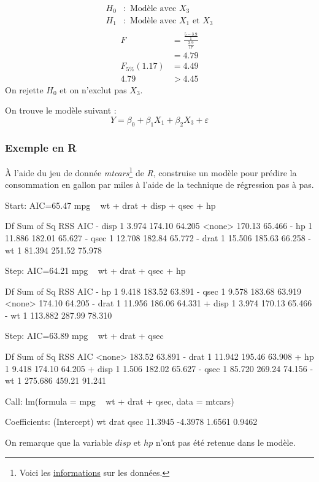 \documentclass[11pt,french]{report}
\begin{document}
\begin{align*}
H_0 &: \text{ Modèle avec $X_3$} \\
H_1 &: \text{ Modèle avec $X_1$ et $X_3$} \\
\end{align*}
\begin{align*}
F &= \frac{\frac{5 - 3.9}{1}}{\frac{3.9}{17}} \\
&= 4.79 \\
F_{5 \%}(1.17) &= 4.49 \\
4.79 &> 4.45
\end{align*}
On rejette $H_0$ et on n'exclut pas $X_3$. \newline

On trouve le modèle suivant :
$$
Y = \beta_0 + \beta_1X_1 + \beta_2X_3 + \varepsilon
$$

\subsubsection*{Exemple en R}
À l'aide du jeu de donnée \emph{mtcars}\footnote{Voici les \href{https://stat.ethz.ch/R-manual/R-devel/library/datasets/html/mtcars.html}{informations} sur les données.} de \emph{R}, construise un modèle pour prédire la consommation en gallon par miles à l'aide de la technique de régression pas à pas. 
\begin{Schunk}
\begin{Soutput}
Start:  AIC=65.47
mpg ~ wt + drat + disp + qsec + hp

       Df Sum of Sq    RSS    AIC
- disp  1     3.974 174.10 64.205
<none>              170.13 65.466
- hp    1    11.886 182.01 65.627
- qsec  1    12.708 182.84 65.772
- drat  1    15.506 185.63 66.258
- wt    1    81.394 251.52 75.978

Step:  AIC=64.21
mpg ~ wt + drat + qsec + hp

       Df Sum of Sq    RSS    AIC
- hp    1     9.418 183.52 63.891
- qsec  1     9.578 183.68 63.919
<none>              174.10 64.205
- drat  1    11.956 186.06 64.331
+ disp  1     3.974 170.13 65.466
- wt    1   113.882 287.99 78.310

Step:  AIC=63.89
mpg ~ wt + drat + qsec

       Df Sum of Sq    RSS    AIC
<none>              183.52 63.891
- drat  1    11.942 195.46 63.908
+ hp    1     9.418 174.10 64.205
+ disp  1     1.506 182.02 65.627
- qsec  1    85.720 269.24 74.156
- wt    1   275.686 459.21 91.241

Call:
lm(formula = mpg ~ wt + drat + qsec, data = mtcars)

Coefficients:
(Intercept)           wt         drat         qsec  
    11.3945      -4.3978       1.6561       0.9462  
\end{Soutput}
\end{Schunk}
On remarque que la variable $disp$ et $hp$ n'ont pas été retenue dans le modèle.
\end{document}
